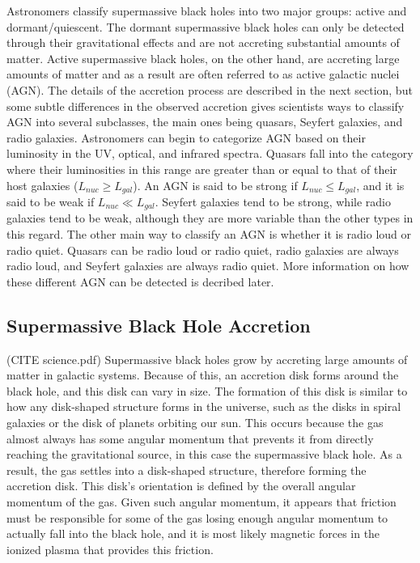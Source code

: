 \documentclass[12pt]{article}
\begin{document}
Astronomers classify supermassive black holes into two major groups: active and
dormant/quiescent.  The dormant supermassive black holes can only be detected
through
their gravitational effects and are not accreting substantial amounts of matter.
Active supermassive black holes, on the other hand, are accreting large amounts
of matter and as a result are often referred to as active galactic nuclei (AGN).
The details of the accretion process are described in the next section, but some
subtle differences in the observed accretion gives scientists ways to classify
AGN into several subclasses, the main ones being quasars, Seyfert galaxies, and
radio galaxies.  Astronomers can begin to categorize AGN based on their
luminosity in the UV, optical, and infrared spectra.  Quasars fall into the
category where their luminosities in this range are greater than or equal to
that of their host galaxies ($L_{nuc} \ge L_{gal}$).  An AGN is said to be
strong if $L_{nuc} \le L_{gal}$, and it is said to be weak if $L_{nuc} \ll
L_{gal}$.  Seyfert galaxies tend to be strong, while radio galaxies tend to be
weak, although they are more variable than the other types in this regard.  The
other main way to classify an AGN is whether it is radio loud or radio quiet.
Quasars can be radio loud or radio quiet, radio galaxies are always radio loud,
and Seyfert galaxies are always radio quiet.  More information on how these
different AGN can be detected is decribed later.


\subsection{Supermassive Black Hole Accretion}
(CITE science.pdf)
Supermassive black holes grow by accreting large amounts of matter in
galactic systems.  Because of this, an accretion disk forms around the black
hole, and this disk can vary in size.  The formation of this disk is similar
to how any disk-shaped structure forms in the universe, such as the disks in
spiral galaxies or the disk of planets orbiting our sun.  This occurs
because the gas almost always has some angular momentum that prevents it
from directly reaching the gravitational source, in this case the
supermassive black hole.  As a result, the gas settles into a disk-shaped
structure, therefore forming the accretion disk.  This disk's orientation is
defined by the overall angular momentum of the gas.  Given such angular
momentum, it appears that friction must be responsible for some of the gas
losing enough angular momentum to actually fall into the black hole, and it
is most likely magnetic forces in the ionized plasma that provides this
friction.
\end{document}
